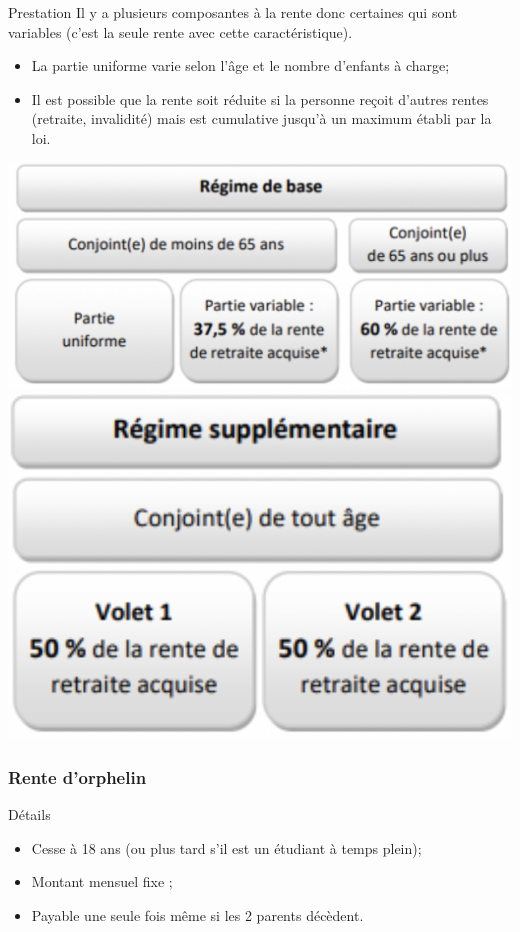 \documentclass[10pt, french]{article}
\begin{document}
\begin{multicols*}{3}
\begin{conceptgen}{Prestation}
Il y a plusieurs composantes à la rente donc certaines qui sont variables (c'est la seule rente avec cette caractéristique).
\begin{itemize}[leftmargin = *]
	\item	La partie uniforme varie selon l'âge et le nombre d'enfants à charge;
	\item	Il est possible que la rente soit réduite si la personne reçoit d'autres rentes (retraite, invalidité) mais est cumulative jusqu'à un maximum établi par la loi.
\end{itemize}
\begin{center}
	\includegraphics[scale=0.2]{src/ACT-1005/rente-conj-surv.png}
	\includegraphics[scale=0.2]{src/ACT-1005/rente-conj-surv-2.png}
\end{center}
\end{conceptgen}

\subsubsection*{Rente d'orphelin}

\begin{conceptgen}{Détails}
\begin{itemize}[leftmargin = *]
	\item	Cesse à 18 ans (ou plus tard s'il est un étudiant à temps plein);
	\item	Montant mensuel fixe ;
	\item	Payable une seule fois même si les 2 parents décèdent.
\end{itemize}
\end{conceptgen}


\end{multicols*}
\end{document}
